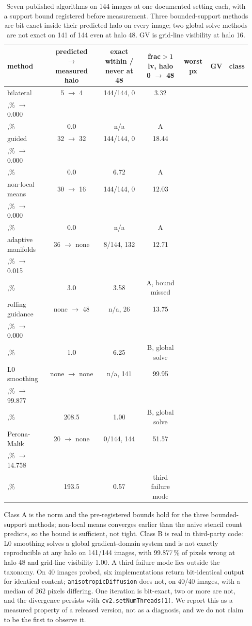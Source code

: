 \documentclass[journal]{IEEEtran}
\begin{document}
\begin{table}[t]
\caption{Seven published algorithms on 144 images at one documented setting each, with a support bound registered before measurement. Three bounded-support methods are bit-exact inside their predicted halo on every image; two global-solve methods are not exact on 141 of 144 even at halo 48. GV is grid-line visibility at halo 16.}
\label{tab:thirdparty}
\centering
\footnotesize
\begin{tabular}{@{}lcccccc@{}}
\toprule
method & predicted $\to$ measured halo & exact within / never at 48 & frac$>1$ lv, halo 0 $\to$ 48 & worst px & GV & class \\
\midrule
bilateral & 5 $\to$ 4 & 144/144, 0 & 3.32\\,\% $\to$ 0.000\\,\% & 0.0 & n/a & A \\
guided & 32 $\to$ 32 & 144/144, 0 & 18.44\\,\% $\to$ 0.000\\,\% & 0.0 & 6.72 & A \\
non-local means & 30 $\to$ 16 & 144/144, 0 & 12.03\\,\% $\to$ 0.000\\,\% & 0.0 & n/a & A \\
adaptive manifolds & 36 $\to$ none & 8/144, 132 & 12.71\\,\% $\to$ 0.015\\,\% & 3.0 & 3.58 & A, bound missed \\
rolling guidance & none $\to$ 48 & n/a, 26 & 13.75\\,\% $\to$ 0.000\\,\% & 1.0 & 6.25 & B, global solve \\
L0 smoothing & none $\to$ none & n/a, 141 & 99.95\\,\% $\to$ 99.877\\,\% & 208.5 & 1.00 & B, global solve \\
Perona-Malik & 20 $\to$ none & 0/144, 144 & 51.57\\,\% $\to$ 14.758\\,\% & 193.5 & 0.57 & third failure mode \\
\bottomrule
\end{tabular}
\end{table}

Class A is the norm and the pre-registered bounds hold for the three bounded-support methods; non-local means converges earlier than the naive stencil count predicts, so the bound is sufficient, not tight. Class B is real in third-party code: L0 smoothing solves a global gradient-domain system and is not exactly reproducible at any halo on 141/144 images, with 99.877\,\% of pixels wrong at halo 48 and grid-line visibility 1.00. A third failure mode lies outside the taxonomy. On 40 images probed, six implementations return bit-identical output for identical content; \texttt{anisotropicDiffusion} does not, on 40/40 images, with a median of 262 pixels differing. One iteration is bit-exact, two or more are not, and the divergence persists with \texttt{cv2.setNumThreads(1)}. We report this as a measured property of a released version, not as a diagnosis, and we do not claim to be the first to observe it.
\end{document}
